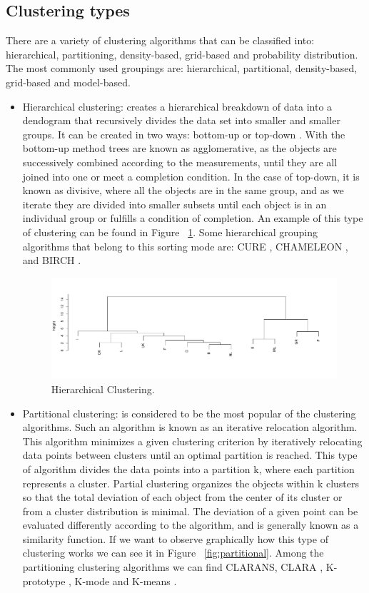 \subsection{Clustering types}

There are a variety of clustering algorithms that can be classified into: hierarchical, partitioning, density-based, grid-based and probability distribution. The most commonly used groupings are: hierarchical, partitional, density-based, grid-based and model-based.
\\
\begin{itemize}
  \item Hierarchical clustering: creates a hierarchical breakdown of data into a dendogram that recursively divides the data set into smaller and smaller groups. It can be created in two ways: bottom-up or top-down \citep{b19}. With the bottom-up method trees are known as agglomerative, as the objects are successively combined according to the measurements, until they are all joined into one or meet a completion condition. In the case of top-down, it is known as divisive, where all the objects are in the same group, and as we iterate they are divided into smaller subsets until each object is in an individual group or fulfills a condition of completion. An example of this type of clustering can be found in Figure ~\ref{fig:hierarchical}. Some hierarchical grouping algorithms that belong to this sorting mode are: CURE \citep{b20}, CHAMELEON \citep{b21}, and BIRCH \citep{b22}.
\begin{figure}[htbp]
  \centering
   \includegraphics[width=0.9\linewidth, height=0.2\textheight]{img/hierarchical.pdf}
    \caption{Hierarchical Clustering.}
    \label{fig:hierarchical}%
\end{figure}
  \item Partitional clustering: is considered to be the most popular of the clustering algorithms. Such an algorithm is known as an iterative relocation algorithm. This algorithm minimizes a given clustering criterion by iteratively relocating data points between clusters until an optimal partition is reached. This type of algorithm divides the data points into a partition k, where each partition represents a cluster. Partial clustering organizes the objects within k clusters so that the total deviation of each object from the center of its cluster or from a cluster distribution is minimal. The deviation of a given point can be evaluated differently according to the algorithm, and is generally known as a similarity function. If we want to observe graphically how this type of clustering works we can see it in Figure ~\ref{fig:partitional}. Among the partitioning clustering algorithms we can find CLARANS, CLARA \citep{b24}, K-prototype \citep{b25}, K-mode \citep{b26} and K-means \citep{b27}.

\end{itemize}
